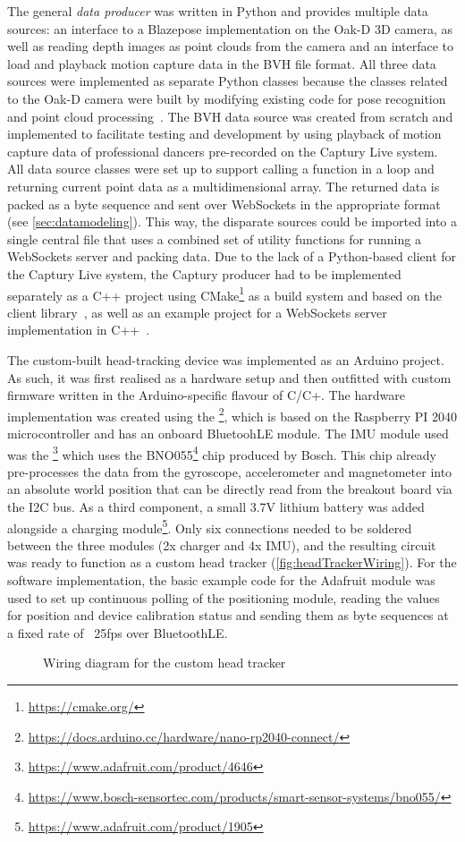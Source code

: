 The general \emph{data producer} was written in Python and provides multiple data sources: an interface to a Blazepose implementation on the Oak-D \ac{3D} camera, as well as reading depth images as point clouds from the camera and an interface to load and playback motion capture data in the \ac{BVH} file format.
All three data sources were implemented as separate Python classes because the classes related to the Oak-D camera were built by modifying existing code for pose recognition~\parencite{githubDepthAiBlazePose} and point cloud processing~\parencite{githubDepthAiPointcloud}.
The \ac{BVH} data source was created from scratch and implemented to facilitate testing and development by using playback of motion capture data of professional dancers pre-recorded on the Captury Live system.
All data source classes were set up to support calling a function in a loop and returning current point data as a multidimensional array.
The returned data is packed as a byte sequence and sent over WebSockets in the appropriate format (see \autoref{sec:datamodeling}).
This way, the disparate sources could be imported into a single central file that uses a combined set of utility functions for running a WebSockets server and packing data.
Due to the lack of a Python-based client for the Captury Live system, the Captury producer had to be implemented separately as a C++ project using CMake\footnote{\url{https://cmake.org/}} as a build system and based on the  client library~\parencite{githubRemoteCaptury}, as well as an example project for a WebSockets server implementation in C++~\parencite{githubCppWebSocketsDemo}.

The custom-built head-tracking device was implemented as an Arduino project.
As such, it was first realised as a hardware setup and then outfitted with custom firmware written in the Arduino-specific flavour of C/C+.
The hardware implementation was created using the \footnote{\url{https://docs.arduino.cc/hardware/nano-rp2040-connect/}}, which is based on the Raspberry PI 2040 microcontroller and has an onboard BluetoohLE module.
The \ac{IMU} module used was the \footnote{\url{https://www.adafruit.com/product/4646}} which uses the BNO055\footnote{\url{https://www.bosch-sensortec.com/products/smart-sensor-systems/bno055/}} chip produced by Bosch.
This chip already pre-processes the data from the gyroscope, accelerometer and magnetometer into an absolute world position that can be directly read from the breakout board via the \ac{I2C} bus.
As a third component, a small 3.7V lithium battery was added alongside a charging module\footnote{\url{https://www.adafruit.com/product/1905}}.
Only six connections needed to be soldered between the three modules (2x charger and 4x \ac{IMU}), and the resulting circuit was ready to function as a custom head tracker (\autoref{fig:headTrackerWiring}).
For the software implementation, the basic example code for the Adafruit module was used to set up continuous polling of the positioning module, reading the values for position and device calibration status and sending them as byte sequences at a fixed rate of ~25fps over BluetoothLE\@.

\begin{figure}[!ht]
\centering

\caption[Head tracker wiring diagram]{Wiring diagram for the custom head tracker\protect}
\label{fig:headTrackerWiring}
\end{figure}
